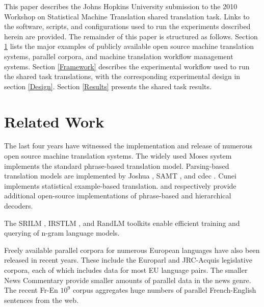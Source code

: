 \documentclass[11pt]{article}
\begin{document}
This paper describes the Johns Hopkins University submission to the 2010 Workshop on Statistical Machine Translation shared translation task. Links to the software, scripts, and configurations used to run the experiments described herein are provided. The remainder of this paper is structured as follows. Section \ref{Related Work} lists the major examples of publicly available open source machine translation systems, parallel corpora, and machine translation workflow management systems. Section \ref{Framework} describes the experimental workflow used to run the shared task translations, with the corresponding experimental design in section \ref{Design}. Section \ref{Results} presents the shared task results.






\begin{figure*}[htbp]

\caption{Machine translation workflow. Nodes in grey indicate software and scripts. The scripts and configuration files used to implement and run this workflow are available for download at \url{http://sourceforge.net/projects/joshua/files/joshua/1.3/wmt2010-experiment.tgz}}
\label{dependencyGraph}
\end{figure*}


\section{Related Work}
\label{Related Work}

The last four years have witnessed the implementation and release of numerous open source machine translation systems. The widely used Moses system \cite{moses} implements the standard phrase-based translation model. Parsing-based translation models are implemented by Joshua \cite{Joshua-WMT}, SAMT \cite{samt2006}, and cdec \cite{cdec}. Cunei \cite{Phillips2009} implements statistical example-based translation.  and  respectively provide additional open-source implementations of phrase-based and hierarchical decoders.

The SRILM \cite{Stolcke2002}, IRSTLM \cite{IRSTLM}, and RandLM \cite{Talbot2007a} toolkits enable efficient training and querying of n-gram language models. 

Freely available parallel corpora for numerous European languages have also been released in recent years. These include the Europarl \cite{Koehn-europarl} and JRC-Acquis \cite{Steinberger-2006} legislative corpora, each of which includes data for most EU language pairs. The smaller News Commentary \cite{Callison-Burch2007a,Callison-Burch2008a} provide smaller amounts of parallel data in the news genre. The recent Fr-En $10^9$ \cite{WMT09-Findings} corpus aggregates huge numbers of parallel French-English sentences from the web.
\end{document}
